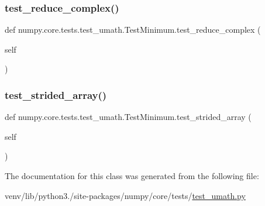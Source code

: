 \subsubsection{\texorpdfstring{test\+\_\+reduce\+\_\+complex()}{test\_reduce\_complex()}}
{\footnotesize\ttfamily def numpy.\+core.\+tests.\+test\+\_\+umath.\+Test\+Minimum.\+test\+\_\+reduce\+\_\+complex (\begin{DoxyParamCaption}\item[{}]{self }\end{DoxyParamCaption})}

\mbox{\label{classnumpy_1_1core_1_1tests_1_1test__umath_1_1TestMinimum_a07179981c5f611bb399eeed0a2b67dba}} 
\subsubsection{\texorpdfstring{test\+\_\+strided\+\_\+array()}{test\_strided\_array()}}
{\footnotesize\ttfamily def numpy.\+core.\+tests.\+test\+\_\+umath.\+Test\+Minimum.\+test\+\_\+strided\+\_\+array (\begin{DoxyParamCaption}\item[{}]{self }\end{DoxyParamCaption})}



The documentation for this class was generated from the following file\+:\begin{DoxyCompactItemize}
\item 
venv/lib/python3./site-\/packages/numpy/core/tests/\hyperlink{test__umath_8py}{test\+\_\+umath.\+py}\end{DoxyCompactItemize}
